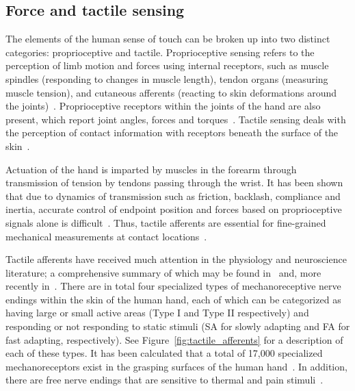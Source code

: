 
\subsection{Force and tactile sensing}
\label{touch_sensing}
The elements of the human sense of touch can be broken up into two distinct categories: proprioceptive and tactile.
Proprioceptive sensing refers to the perception of limb motion and forces using internal receptors, such as muscle spindles (responding to changes in muscle length), tendon organs (measuring muscle tension), and cutaneous afferents (reacting to skin deformations around the joints)~\cite{johansson2009coding}.
Proprioceptive receptors within the joints of the hand are also present, which report joint angles, forces and torques~\cite{howe1993tactile}.
Tactile sensing deals with the perception of contact information with receptors beneath the surface of the skin~\cite{vallbo1984properties}.

Actuation of the hand is imparted by muscles in the forearm through transmission of tension by tendons passing through the wrist.
It has been shown that due to dynamics of transmission such as friction, backlash, compliance and inertia, accurate control of endpoint position and forces based on proprioceptive signals alone is difficult~\cite{kaneko1991new}.
Thus, tactile afferents are essential for fine-grained mechanical measurements at contact locations~\cite{Johansson1984}.

Tactile afferents have received much attention in the physiology and neuroscience literature; a comprehensive summary of which may be found in~\cite{vallbo1984properties} and, more recently in~\cite{johansson2009coding}.
There are in total four specialized types of mechanoreceptive nerve endings within the skin of the human hand, each of which can be categorized as having large or small active areas (Type I and Type II respectively) and responding or not responding to static stimuli (SA for slowly adapting and FA for
fast adapting, respectively).
See Figure~\ref{fig:tactile_afferents} for a description of each of these types.
It has been calculated that a total of 17,000 specialized mechanoreceptors exist in the grasping surfaces of the human hand~\cite{johansson2009coding}.
In addition, there are free nerve endings that are sensitive to thermal and pain stimuli~\cite{howe1993tactile}.

